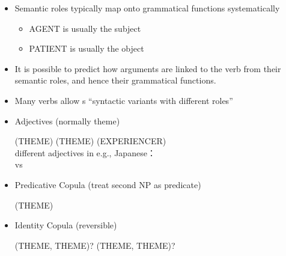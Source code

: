 \documentclass[a4paper,landscape,headrule,footrule,xetex]{foils}
\begin{document}
\begin{itemize}
\item    Semantic roles typically map onto grammatical 
  functions systematically
  \begin{itemize}
  \item  AGENT is usually the subject
  \item  PATIENT is usually the object
  \end{itemize}
\item  It is possible to predict how arguments are linked to 
the verb from their semantic roles, and hence their 
grammatical functions.

\item Many verbs allow s ``syntactic variants with different roles''

\begin{exe}
  \ex {}  
  \ex {}  
  \ex {}  
\end{exe}
\end{itemize}


\begin{itemize}
\item Adjectives  (normally theme)
  \begin{exe}
  \ex {} (THEME)
  \ex {} (THEME)
  \ex {} (EXPERIENCER)
    \\ different adjectives in e.g., Japanese：
    \\     vs  
  \end{exe}
\item Predicative Copula (treat second NP as predicate)
  \begin{exe}
  \ex {} (THEME)
  \end{exe}
\item Identity Copula (reversible)
  \begin{exe}
  \ex {} (THEME, THEME)?
  \ex {} (THEME, THEME)?
  \end{exe}


\end{itemize}
\end{document}
